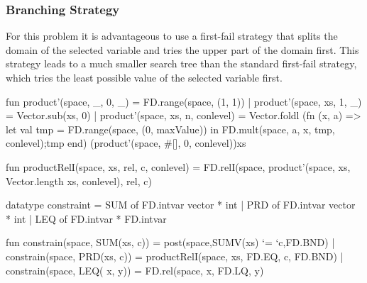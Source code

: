 \documentclass[a4paper,halfparskip]{scrartcl}
\begin{document}
\subsubsection{Branching Strategy}
For this problem it is advantageous to use a first-fail strategy 
that splits the domain 
of the selected variable and tries the upper part of the domain 
first. This strategy leads 
to a much smaller search tree than the standard first-fail strategy, 
which tries the least 
possible value of the selected variable first. 


\begin{myverbatim}

fun product'(space,  _, 0, _) = FD.range(space, (1, 1))
  | product'(space, xs, 1, _) = Vector.sub(xs, 0)
  | product'(space, xs, n, conlevel) =
       Vector.foldl (fn (x, a) =>
          let
             val tmp = FD.range(space, (0, maxValue))
          in
             FD.mult(space, a, x, tmp, conlevel);tmp
          end)
          (product'(space, #[], 0, conlevel))xs
 
fun productRelI(space, xs, rel, c, conlevel) =
   FD.relI(space, 
   product'(space, xs, Vector.length xs, conlevel), rel, c)       
 
datatype constraint =
   SUM of FD.intvar vector * int
 | PRD of FD.intvar vector * int
 | LEQ of FD.intvar * FD.intvar


fun constrain(space, SUM(xs, c)) = 
       post(space,SUMV(xs) `= `c,FD.BND)
  | constrain(space, PRD(xs, c)) = 
       productRelI(space, xs, FD.EQ, c, FD.BND)
  | constrain(space, LEQ( x, y)) = 
       FD.rel(space, x, FD.LQ, y)

\end{myverbatim}
\end{document}

